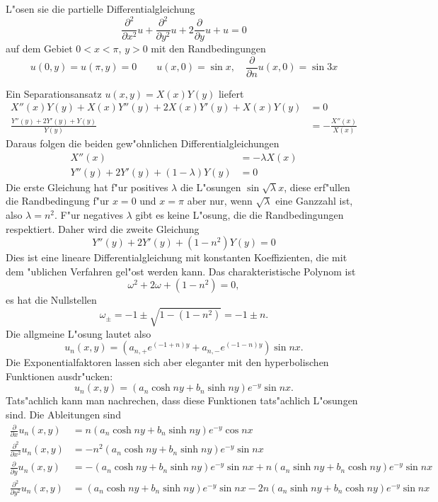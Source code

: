 L"osen sie die partielle Differentialgleichung
\[
\frac{\partial^2}{\partial x^2}u+\frac{\partial^2}{\partial y^2}u
+2\frac{\partial }{\partial y}u+u=0
\]
auf dem Gebiet $0 < x < \pi$, $y > 0$ mit den Randbedingungen
\[
u(0,y)=u(\pi,y)=0
\quad
\quad
u(x,0)=\sin x,\quad \frac{\partial }{\partial n}u(x,0)=\sin 3x
\]

\begin{loesung}
Ein Separationsansatz $u(x,y)=X(x)Y(y)$ liefert
\begin{align*}
X''(x)Y(y)+X(x)Y''(y)+2X(x)Y'(y)+X(x)Y(y)&=0
\\
\frac{Y''(y)+2Y'(y)+Y(y)}{Y(y)}
&=
-\frac{X''(x)}{X(x)}
\end{align*}
Daraus folgen die beiden gew"ohnlichen Differentialgleichungen
\begin{align*}
X''(x)&=-\lambda X(x)\\
Y''(y)+2Y'(y)+(1-\lambda)Y(y)&=0
\end{align*}
Die erste Gleichung hat f"ur positives $\lambda$ die L"osungen
$\sin\sqrt{\lambda}x$, diese erf"ullen die Randbedingung f"ur $x=0$
und $x=\pi$ aber nur, wenn $\sqrt{\lambda}$ eine Ganzzahl ist, also
$\lambda=n^2$. F"ur negatives $\lambda$ gibt es keine L"osung,
die die Randbedingungen respektiert. Daher wird die zweite Gleichung
\[
Y''(y)+2Y'(y)+(1-n^2)Y(y)=0
\]
Dies ist eine lineare Differentialgleichung mit konstanten
Koeffizienten, die mit dem "ublichen Verfahren gel"ost werden
kann. Das charakteristische Polynom ist
\[
\omega^2+2\omega+(1-n^2)=0,
\]
es hat die Nullstellen
\[
\omega_{\pm}=-1\pm{\sqrt{1-(1-n^2)}}=-1\pm n.
\]
Die allgmeine L"osung lautet also
\[
u_n(x,y)=(a_{n,+}e^{(-1+n)y}+a_{n,-}e^{(-1-n)y})\sin nx.
\]
Die Exponentialfaktoren lassen sich aber eleganter
mit den hyperbolischen Funktionen ausdr"ucken:
\[
u_n(x,y)=(a_n\cosh ny+b_n\sinh ny)e^{-y}\sin nx.
\]
Tats"achlich kann man nachrechen, dass diese Funktionen
tats"achlich L"osungen sind. Die Ableitungen sind
\begin{align*}
\frac{\partial}{\partial x}u_n(x,y)
&=
n (a_n\cosh ny+b_n\sinh ny)e^{-y}\cos nx
\\
\frac{\partial^2}{\partial x^2}u_n(x,y)
&=
-n^2 (a_n\cosh ny+b_n\sinh ny)e^{-y}\sin nx
\\
\frac{\partial}{\partial y}u_n(x,y)
&=
-(a_n\cosh ny+b_n\sinh ny)e^{-y}\sin nx
+
n(a_n\sinh ny+b_n\cosh ny)e^{-y}\sin nx
\\
\frac{\partial^2}{\partial y^2}u_n(x,y)
&=
(a_n\cosh ny+b_n\sinh ny)e^{-y}\sin nx
-2n(a_n\sinh ny+b_n\cosh ny)e^{-y}\sin nx
\\

\end{align*}
\end{loesung}
